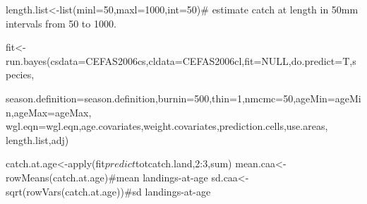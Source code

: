\begin{Examples}
\begin{ExampleCode}
length.list<-list(minl=50,maxl=1000,int=50)# estimate catch at length in 50mm intervals from 50 
to 1000.

fit<-run.bayes(csdata=CEFAS2006cs,cldata=CEFAS2006cl,fit=NULL,do.predict=T,species,
               
season.definition=season.definition,burnin=500,thin=1,nmcmc=50,ageMin=ageMin,ageMax=ageMax,
                    wgl.eqn=wgl.eqn,age.covariates,weight.covariates,prediction.cells,use.areas,
               length.list,adj)

catch.at.age<-apply(fit$predict$totcatch.land,2:3,sum)
mean.caa<-rowMeans(catch.at.age)#mean landings-at-age
sd.caa<-sqrt(rowVars(catch.at.age))#sd landings-at-age
\end{ExampleCode}
\end{Examples}


